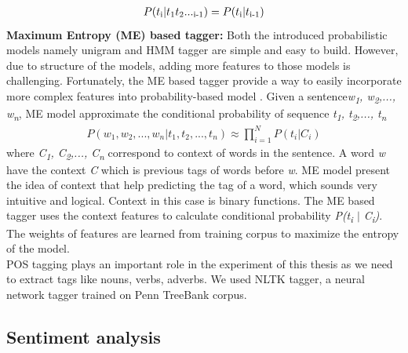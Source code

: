\begin{eqnarray*}
P(t\textsubscript{i} \vert t\textsubscript{1}t\textsubscript{2}...\textsubscript{i-1}) = P(t\textsubscript{i} \vert t\textsubscript{i-1})
\end{eqnarray*}
\textbf{Maximum Entropy (ME) based tagger:} Both the introduced probabilistic models namely unigram and HMM tagger are simple and easy to build. However, due to structure of the models, adding more features to those models is challenging. Fortunately, the ME based tagger provide a way to easily incorporate more complex features into probability-based model \cite{Ratnaparkhi1996}. Given a sentence\textit{w\textsubscript{1}, w\textsubscript{2},..., w\textsubscript{n}}, ME model approximate the conditional probability of sequence \textit{t\textsubscript{1}, t\textsubscript{2},..., t\textsubscript{n}}
\begin{eqnarray*}
P(w_{1}, w_{2},..., w_{n} \vert t_{1}, t_{2},..., t_{n}) \approx \prod_{i=1}^{N} P(t_{i} \vert C_{i})
\end{eqnarray*}
where \textit{C\textsubscript{1}, C\textsubscript{2},..., C\textsubscript{n}} correspond to context of words in the sentence. A word \textit{w} have the context \textit{C} which is previous tags of words before \textit{w}. ME model present the idea of context that help predicting the tag of a word, which sounds very intuitive and logical. Context in this case is binary functions. The ME based tagger uses the context features to calculate conditional probability \textit{P(t\textsubscript{i} $\vert$ C\textsubscript{i})}. The weights of features are learned from training corpus to maximize the entropy of the model.\\
POS tagging plays an important role in the experiment of this thesis as we need to extract tags like nouns, verbs, adverbs. We used NLTK tagger, a neural network tagger trained on Penn TreeBank corpus.
\subsection*{Sentiment analysis}




